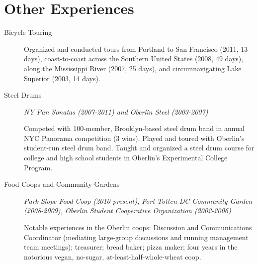 \documentclass{article}
\begin{document}
	\section*{Other Experiences}
	\begin{description}
			\item[Bicycle Touring] Organized and conducted tours from
			Portland to San Francisco (2011, 13 days), 
			coast-to-coast across the Southern United States (2008, 49 days),
			along the Mississippi River (2007, 25 days), and
			circumnavigating Lake Superior (2003, 14 days).
					
			\item[Steel Drums] \emph{NY Pan Sonatas (2007-2011) and Oberlin Steel (2003-2007)}

			Competed with 100-member, Brooklyn-based steel drum band in 
			annual NYC Panorama competition (3 wins).
			Played and toured with Oberlin's student-run steel drum band.
			Taught and organized a steel drum course for college and high 
			school students in Oberlin's Experimental College Program.
			
			\item[Food Coops and Community Gardens] 
			\emph{Park Slope Food Coop (2010-present), 
				Fort Totten DC Community Garden (2008-2009),
				Oberlin Student Cooperative Organization (2002-2006)
			}

			Notable experiences in the Oberlin coops:
			Discussion and Communications Coordinator 
			(mediating large-group discussions and running management team meetings);
			treasurer; bread baker; pizza maker; 
			four years in the notorious vegan, no-sugar, at-least-half-whole-wheat coop.
	\end{description} 
			
\end{document}
